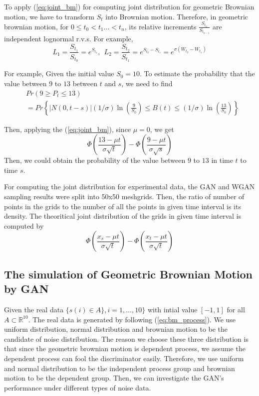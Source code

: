 \documentclass{article}
\begin{document}
	To apply (\ref{eq:joint_bm}) for computing joint distribution for geometric Brownian motion, we have to transform $S_t$ into Brownian motion. 
	Therefore, in geometric brownian motion, for $0\leq t_{0} < t_{1} \dots < t_{n}$, its relative increments $\frac{S_{t_{n}}}{S_{t_{n-1}}}$ are independent lognormal r.v.s. For example,
	\begin{equation}
	L_1 = \frac{S_{t_{1}}}{S_{t_{0}}} = e^{S_{t_{1}}}, \ \ L_2 = \frac{S_{t_{2}}}{S_{t_{1}}} = e^{S_{t_{2}}-S_{t_{1}}} = e^{\sigma(W_{t_2}-W_{t_1})} 
	\end{equation}
	
	For example, Given the initial value $S_0=10$. To estimate the probability that the value between $9$ to $13$ between $t$ and $s$, we need to find
	\begin{equation} 
	\begin{aligned}
	&Pr(  9 \geq P_t \leq 13) \\
	&= Pr\left\{|N(0,t-s) | (1/\sigma)\ln\left(\frac{9}{S_0}\right) \leq  B(t) \leq (1/\sigma)\ln\left(\frac{13}{S_0}\right)\right\}
	\end{aligned}
	\end{equation}
	
	Then, applying the (\ref{eq:joint_bm}), since $\mu=0$, we get 
	\begin{equation}
	\Phi\left(\frac{13-\mu t }{\sigma \sqrt{t}}\right) - \Phi\left(\frac{9 -\mu t }{\sigma \sqrt{s}}\right)
	\end{equation}
	Then, we could obtain the probability of the value between $9$ to $13$ in time $t$ to time $s$.
	
	For computing the joint distribution for experimental data, the GAN and WGAN sampling results were split into 50x50 meshgrids. Then, the ratio of number of points in the grids to the number of all the points in given time interval is its density. 
	The theoritical joint distribution of the grids in given time interval is computed by 
	\begin{equation}
	\Phi\left(\frac{x_s-\mu t }{\sigma \sqrt{t}}\right) - \Phi\left(\frac{x_t -\mu t }{\sigma \sqrt{t}}\right)
	\label{eq:ffd_central}
	\end{equation}
	
	
	\subsection{The simulation of Geometric Brownian Motion by GAN}
	
	Given the real data $\{ s(i)\in A \}, i = 1, \dots, 10\}$ with intial value $[-1,1]$ for all $A \subset \mathbb{R}^{10}$.
	The real data is generated by following (\ref{eq:bm_process}).
	We use uniform distribution, normal distribution and brownian motion to be the candidate of noise distribution. 
	The reason we choose these three distribution is that since the geometric brownian motion is dependent process, we assume the dependent process can fool the discriminator easily.
	Therefore, we use uniform and normal distribution to be the independent process group and brownian motion to be the dependent group.
	Then, we can investigate the GAN's performance under different types of noise data.
	
\end{document}
